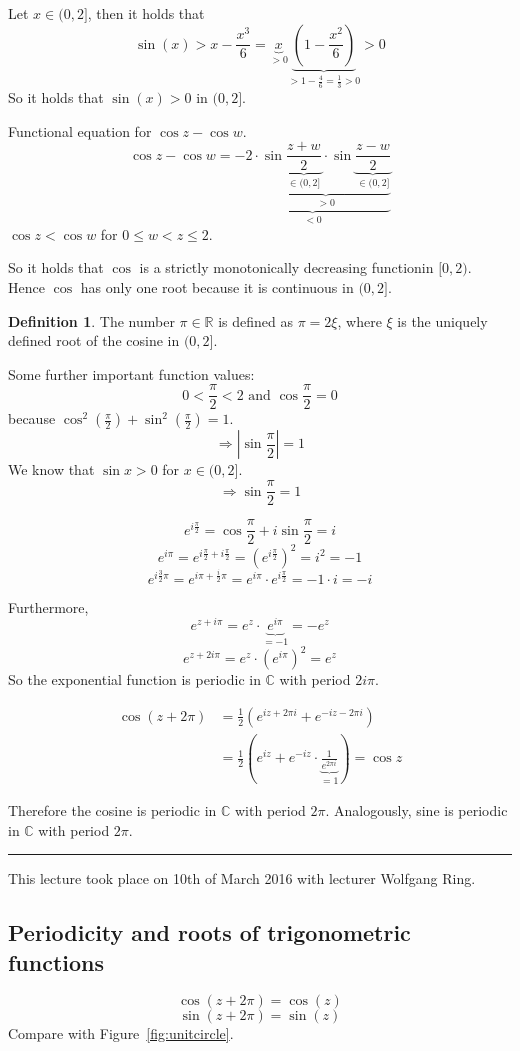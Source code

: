 \documentclass[a4paper,landscape,twocolumn]{article}
\theoremstyle{definition}
\newtheorem{defi}{Definition}
\newcommand\abs[1]{\left|#1\right|}
\newcommand\meta[3]{\hrule{} This #1 took place on #2 with lecturer #3.\par}
\begin{document}
Let $x \in (0,2]$, then it holds that
\[ \sin(x) > x - \frac{x^3}{6} = \underbrace{x}_{>0} \underbrace{\left(1 - \frac{x^2}{6}\right)}_{>1 - \frac46 = \frac13 > 0} > 0 \]
So it holds that $\sin(x) > 0$ in $(0,2]$.

Functional equation for $\cos{z} - \cos{w}$.
\[ \cos{z} - \cos{w} = \underbrace{-2  \cdot \underbrace{\sin{\underbrace{\frac{z+w}{2}}_{\in (0,2]}} \cdot \sin{\underbrace{\frac{z-w}{2}}_{\in (0,2]}}}_{>0}}_{<0} \]
$\cos{z} < \cos{w}$ for $0 \leq w < z \leq 2$.

So it holds that $\cos$ is a strictly monotonically decreasing functionin $[0,2)$. Hence $\cos$ has only one root because it is continuous in $(0,2]$.

\begin{defi}
  The number $\pi \in \mathbb R$ is defined as $\pi = 2\xi$, where $\xi$ is the uniquely defined root of the cosine in $(0,2]$.
\end{defi}

Some further important function values:
\[ 0 < \frac{\pi}{2} < 2 \text{ and } \cos{\frac\pi2} = 0 \]
because $\cos^2\left(\frac\pi2\right) + \sin^2\left(\frac\pi2\right) = 1$.
\[ \Rightarrow \abs{\sin\frac\pi2} = 1 \]
We know that $\sin{x} > 0$ for $x \in (0,2]$.
\[ \Rightarrow \sin\frac\pi2 = 1 \]

\[ e^{i \frac\pi2} = \cos\frac\pi2 + i \sin\frac\pi2 = i \]
\[ e^{i\pi} = e^{i\frac\pi2 + i\frac\pi2} = \left(e^{i\frac\pi2}\right)^2 = i^2 = -1 \]
\[ e^{i \frac32\pi} = e^{i\pi + \frac{i}2 \pi} = e^{i\pi} \cdot e^{i \frac\pi2} = -1 \cdot i = -i \]

Furthermore,
\[ e^{z + i\pi} = e^z \cdot \underbrace{e^{i\pi}}_{=-1} = -e^z \]
\[ e^{z + 2i\pi} = e^z \cdot \left(e^{i\pi}\right)^2 = e^z \]
So the exponential function is periodic in $\mathbb C$ with period $2i\pi$.

\begin{align*}
  \cos(z + 2\pi) &= \frac12 \left(e^{iz + 2\pi i} + e^{-iz - 2\pi i}\right) \\
    &= \frac12 \left(e^{iz} + e^{-iz} \cdot \underbrace{\frac1{e^{2\pi i}}}_{=1}\right) = \cos{z}
\end{align*}

Therefore the cosine is periodic in $\mathbb C$ with period $2\pi$.
Analogously, sine is periodic in $\mathbb C$ with period $2\pi$.

\meta{lecture}{10th of March 2016}{Wolfgang Ring}

\subsection{Periodicity and roots of trigonometric functions}
%
\[ \cos(z + 2\pi) = \cos(z) \]
\[ \sin(z + 2\pi) = \sin(z) \]
Compare with Figure~\ref{fig:unitcircle}.
\end{document}
